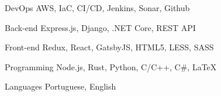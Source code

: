 

\begin{cvskills}

  \cvskill
    {DevOps} %
    {AWS, IaC, CI/CD, Jenkins, Sonar, Github} %

  \cvskill
    {Back-end} %
    {Express.js, Django, .NET Core, REST API} %

  \cvskill
    {Front-end} %
    {Redux, React, GatsbyJS, HTML5, LESS, SASS} %

  \cvskill
    {Programming} %
    {Node.js, Rust, Python, C/C++, C\#, LaTeX} %

  \cvskill
    {Languages} %
    {Portuguese, English} %

\end{cvskills}
